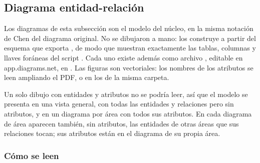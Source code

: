 \subsection*{Diagrama entidad-relación}

Los diagramas de esta subsección son el modelo del núcleo, en la misma notación de Chen del diagrama original. No se dibujaron a mano:  los construye a partir del esquema que exporta , de modo que muestran exactamente las tablas, columnas y llaves foráneas del script . Cada uno existe además como archivo , editable en app.diagrams.net, en . Las figuras son vectoriales: los nombres de los atributos se leen ampliando el PDF, o en los  de la misma carpeta.

Un solo dibujo con \bdNumTablas{} entidades y \bdNumColumnas{} atributos no se podría leer, así que el modelo se presenta en una vista general, con todas las entidades y relaciones pero sin atributos, y en un diagrama por área con todos sus atributos. En cada diagrama de área aparecen también, sin atributos, las entidades de otras áreas que sus relaciones tocan; sus atributos están en el diagrama de su propia área.

\subsubsection*{Cómo se leen}

